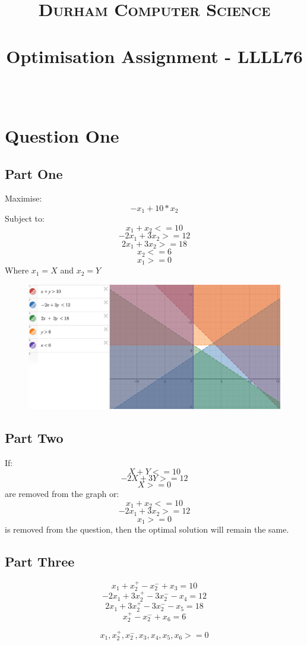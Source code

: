 \documentclass[paper=a4, fontsize=11pt]{scrartcl}
\date{}
\title{
		\vspace{-1in} 	
		\usefont{OT1}{bch}{b}{n}
		\normalfont \normalsize \textsc{Durham Computer Science} \\ [5pt]
		\horrule{0.5pt} \\[0.4cm]
		\large  Optimisation Assignment - LLLL76\\
		\horrule{2pt} \\[0.5cm]
		\vspace{-1in} 	
}
\numberwithin{equation}{section}		%
\numberwithin{figure}{section}			%
\numberwithin{table}{section}				%
\begin{document}
\maketitle
\section*{Question One}
\subsection*{Part One}

Maximise:
\[-x_1 + 10 * x_2 \]
Subject to:
\[ x_1 + x_2 <= 10  \]
\[ -2x_1 + 3x_2 >= 12  \]
\[ 2x_1 + 3x_2 >= 18  \]
\[ x_2 <= 6  \]
\[ x_1 >= 0  \]
Where $ x_1 = X $ and $ x_2 = Y $

\begin{figure}[h]
\centering
\includegraphics[width=\textwidth]{one_one.png}
\end{figure}

\subsection*{Part Two}

If:
\[ X + Y <= 10 \]
\[ -2X + 3Y >= 12 \]
\[ X >= 0 \]
are removed from the graph or:
\[ x_1 + x_2 <= 10  \]
\[ -2x_1 + 3x_2 >= 12  \]
\[ x_1 >= 0  \]
is removed from the question, then the optimal solution will remain the same.

\subsection*{Part Three}

\[ x_1 + x_2^+ - x_2^- + x_3 = 10 \]
\[ -2x_1 + 3x_2^+ - 3x_2^- - x_4 = 12 \]
\[ 2x_1 + 3x_2^+ - 3x_2^- -x_5 = 18 \]
\[ x_2^+ - x_2^- + x_6 = 6 \]

\[ x_1, x_2^+, x_2^-, x_3, x_4, x_5, x_6 >= 0 \]

\end{document}
